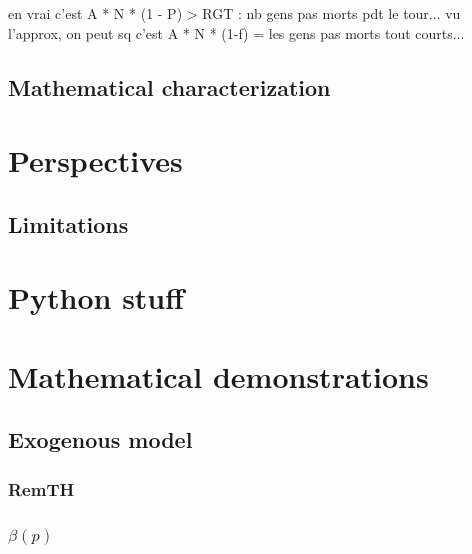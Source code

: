 \documentclass[a4paper,12pt]{article}
\begin{document}
en vrai c'est A * N * (1 - P) > RGT : nb gens pas morts pdt le tour...   
vu l'approx, on peut sq c'est A * N * (1-f) = les gens pas morts tout courts...

\subsection{Mathematical characterization}























\section{Perspectives}
\subsection{Limitations}
\appendix

\section{Python stuff}

\section{Mathematical demonstrations}

\subsection{Exogenous model}
\subsubsection{RemTH}
\subsubsection{$\beta(p)$}
\label{beta}
\end{document}
